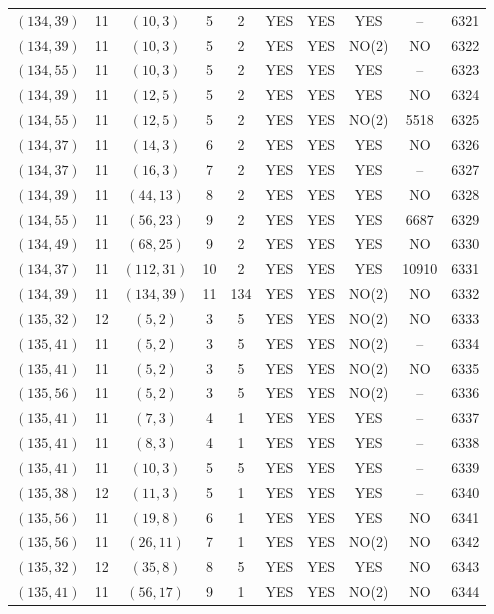 \begin{longtable}{|c|c|c|c|c|c|c|c|c|c|}
$(134, 39)$ & 11 & $(10, 3)$ & 5 & 2 & YES & YES & YES & -- & 6321\\
$(134, 39)$ & 11 & $(10, 3)$ & 5 & 2 & YES & YES & NO(2) & NO & 6322\\
$(134, 55)$ & 11 & $(10, 3)$ & 5 & 2 & YES & YES & YES & -- & 6323\\
$(134, 39)$ & 11 & $(12, 5)$ & 5 & 2 & YES & YES & YES & NO & 6324\\
$(134, 55)$ & 11 & $(12, 5)$ & 5 & 2 & YES & YES & NO(2) & 5518 & 6325\\
$(134, 37)$ & 11 & $(14, 3)$ & 6 & 2 & YES & YES & YES & NO & 6326\\
$(134, 37)$ & 11 & $(16, 3)$ & 7 & 2 & YES & YES & YES & -- & 6327\\
$(134, 39)$ & 11 & $(44, 13)$ & 8 & 2 & YES & YES & YES & NO & 6328\\
$(134, 55)$ & 11 & $(56, 23)$ & 9 & 2 & YES & YES & YES & 6687 & 6329\\
$(134, 49)$ & 11 & $(68, 25)$ & 9 & 2 & YES & YES & YES & NO & 6330\\
$(134, 37)$ & 11 & $(112, 31)$ & 10 & 2 & YES & YES & YES & 10910 & 6331\\
$(134, 39)$ & 11 & $(134, 39)$ & 11 & 134 & YES & YES & NO(2) & NO & 6332\\
$(135, 32)$ & 12 & $(5, 2)$ & 3 & 5 & YES & YES & NO(2) & NO & 6333\\
$(135, 41)$ & 11 & $(5, 2)$ & 3 & 5 & YES & YES & NO(2) & -- & 6334\\
$(135, 41)$ & 11 & $(5, 2)$ & 3 & 5 & YES & YES & NO(2) & NO & 6335\\
$(135, 56)$ & 11 & $(5, 2)$ & 3 & 5 & YES & YES & NO(2) & -- & 6336\\
$(135, 41)$ & 11 & $(7, 3)$ & 4 & 1 & YES & YES & YES & -- & 6337\\
$(135, 41)$ & 11 & $(8, 3)$ & 4 & 1 & YES & YES & YES & -- & 6338\\
$(135, 41)$ & 11 & $(10, 3)$ & 5 & 5 & YES & YES & YES & -- & 6339\\
$(135, 38)$ & 12 & $(11, 3)$ & 5 & 1 & YES & YES & YES & -- & 6340\\
$(135, 56)$ & 11 & $(19, 8)$ & 6 & 1 & YES & YES & YES & NO & 6341\\
$(135, 56)$ & 11 & $(26, 11)$ & 7 & 1 & YES & YES & NO(2) & NO & 6342\\
$(135, 32)$ & 12 & $(35, 8)$ & 8 & 5 & YES & YES & YES & NO & 6343\\
$(135, 41)$ & 11 & $(56, 17)$ & 9 & 1 & YES & YES & NO(2) & NO & 6344\\

\end{longtable}
